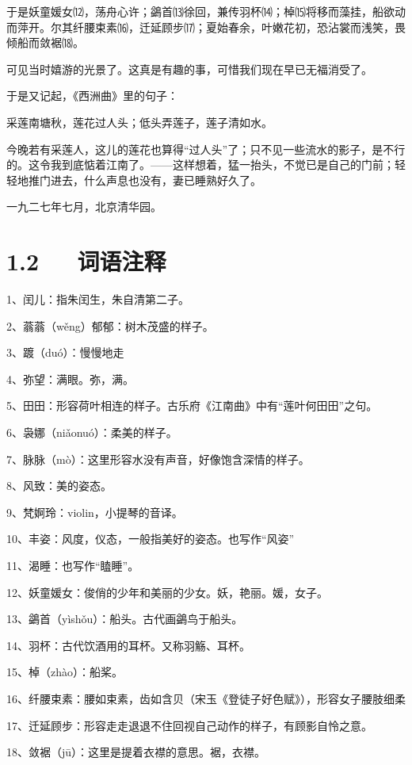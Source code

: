 \documentclass[letterpaper,10pt,english]{sphinxmanual}
\begin{document}
于是妖童媛女⑿，荡舟心许；鷁首⒀徐回，兼传羽杯⒁；棹⒂将移而藻挂，船欲动而萍开。尔其纤腰束素⒃，迁延顾步⒄；夏始春余，叶嫩花初，恐沾裳而浅笑，畏倾船而敛裾⒅。

可见当时嬉游的光景了。这真是有趣的事，可惜我们现在早已无福消受了。

于是又记起，《西洲曲》里的句子：

采莲南塘秋，莲花过人头；低头弄莲子，莲子清如水。

今晚若有采莲人，这儿的莲花也算得“过人头”了；只不见一些流水的影子，是不行的。这令我到底惦着江南了。——这样想着，猛一抬头，不觉已是自己的门前；轻轻地推门进去，什么声息也没有，妻已睡熟好久了。

一九二七年七月，北京清华园。


\section{1.2   词语注释}
\label{\detokenize{p01_u6563_u6587/_u6731_u81ea_u6e05-_u8377_u5858_u6708_u8272:id4}}
1、闰儿：指朱闰生，朱自清第二子。

2、蓊蓊（wěng）郁郁：树木茂盛的样子。

3、踱（duó）：慢慢地走

4、弥望：满眼。弥，满。

5、田田：形容荷叶相连的样子。古乐府《江南曲》中有“莲叶何田田”之句。

6、袅娜（niǎonuó）：柔美的样子。

7、脉脉（mò）：这里形容水没有声音，好像饱含深情的样子。

8、风致：美的姿态。

9、梵婀玲：violin，小提琴的音译。

10、丰姿：风度，仪态，一般指美好的姿态。也写作“风姿”

11、渴睡：也写作“瞌睡”。

12、妖童媛女：俊俏的少年和美丽的少女。妖，艳丽。媛，女子。

13、鷁首（yìshǒu）：船头。古代画鷁鸟于船头。

14、羽杯：古代饮酒用的耳杯。又称羽觞、耳杯。

15、棹（zhào）：船桨。

16、纤腰束素：腰如束素，齿如含贝（宋玉《登徒子好色赋》），形容女子腰肢细柔

17、迁延顾步：形容走走退退不住回视自己动作的样子，有顾影自怜之意。

18、敛裾（jū）：这里是提着衣襟的意思。裾，衣襟。
\end{document}
